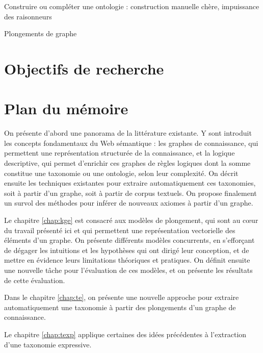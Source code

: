Construire ou compléter une ontologie : construction manuelle chère, impuissance des raisonneurs

Plongements de graphe






\section{Objectifs de recherche}  %


\section{Plan du mémoire}  %


On présente d'abord une panorama de la littérature existante. Y sont introduit les concepts fondamentaux du Web sémantique : les graphes de connaissance, qui permettent une représentation structurée de la connaissance, et la logique descriptive, qui permet d'enrichir ces graphes de règles logiques dont la somme constitue une taxonomie ou une ontologie, selon leur complexité. On décrit ensuite les techniques existantes pour extraire automatiquement ces taxonomies, soit à partir d'un graphe, soit à partir de corpus textuels. On propose finalement un survol des méthodes pour inférer de nouveaux axiomes à partir d'un graphe.

Le chapitre \ref{chap:kge} est consacré aux modèles de plongement, qui sont au cœur du travail présenté ici et qui permettent une représentation vectorielle des éléments d'un graphe. On présente différents modèles concurrents, en s'efforçant de dégager les intuitions et les hypothèses qui ont dirigé leur conception, et de mettre en évidence leurs limitations théoriques et pratiques. On définit ensuite une nouvelle tâche pour l'évaluation de ces modèles, et on présente les résultats de cette évaluation.

Dans le chapitre \ref{chap:te}, on présente une nouvelle approche pour extraire automatiquement une taxonomie à partir des plongements d'un graphe de connaissance.

Le chapitre \ref{chap:texp} applique certaines des idées précédentes à l'extraction d'une taxonomie expressive. 
\clearpage